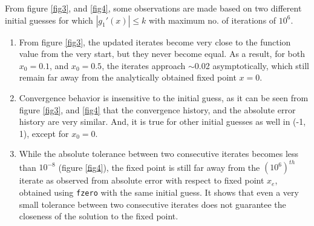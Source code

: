 \documentclass[11pt]{article} %
\begin{document}
From figure \ref{fig3}, and \ref{fig4}, some observations are made based on two different initial guesses for which $\left|g_1'(x)\right| \leq k$ with maximum no. of iterations of $10^6$.
\begin{enumerate}
\item From figure \ref{fig3}, the updated iterates become very close to the function value from the very start, but they never become equal. As a result, for both $x_0 = 0.1$, and $x_0 = 0.5$, the iterates approach $\sim$0.02 asymptotically, which still remain far away from the analytically obtained fixed point $x = 0$.
\item Convergence behavior is insensitive to the initial guess, as it can be seen from figure \ref{fig3}, and \ref{fig4} that the convergence history, and the absolute error history are very similar. And, it is true for other initial guesses as well in (-1, 1), except for $x_0 = 0$.
\item While the absolute tolerance between two consecutive iterates becomes less than $10^{-8}$ (figure \ref{fig4}), the fixed point is still far away from the ${(10^6)}^{th}$ iterate as observed from absolute error with respect to fixed point $x_e$, obtained using \texttt{fzero} with the same initial guess. It shows that even a very small tolerance between two consecutive iterates does not guarantee the closeness of the solution to the fixed point.
\end{enumerate}
\end{document}
